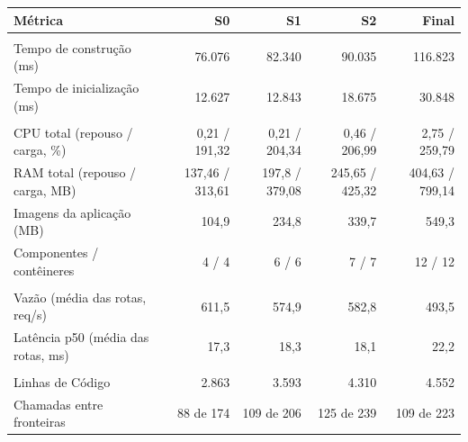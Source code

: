 \begin{quadro}[htb]
  \centering
  \caption{Leilões --- métricas por snapshot --- Capacidade de Negócio.}
  \label{qua:comp_auction_capacidade-negocio_snapshots}
  \renewcommand{\arraystretch}{1.15}
  \begin{tabularx}{\textwidth}{|>{\raggedright\arraybackslash}X|r|r|r|r|}
    \hline
    \textbf{Métrica} & \textbf{S0} & \textbf{S1} & \textbf{S2} & \textbf{Final} \\
    \hline
    \multicolumn{5}{|l|}{\textbf{Agilidade}} \\
    \hline
    Tempo de construção (ms) & 76.076 & 82.340 & 90.035 & 116.823 \\
    Tempo de inicialização (ms) & 12.627 & 12.843 & 18.675 & 30.848 \\
    \hline
    \multicolumn{5}{|l|}{\textbf{Custo}} \\
    \hline
    CPU total (repouso / carga, \%) & 0,21 / 191,32 & 0,21 / 204,34 & 0,46 / 206,99 & 2,75 / 259,79 \\
    RAM total (repouso / carga, MB) & 137,46 / 313,61 & 197,8 / 379,08 & 245,65 / 425,32 & 404,63 / 799,14 \\
    Imagens da aplicação (MB) & 104,9 & 234,8 & 339,7 & 549,3 \\
    Componentes / contêineres & 4 / 4 & 6 / 6 & 7 / 7 & 12 / 12 \\
    \hline
    \multicolumn{5}{|l|}{\textbf{Desempenho}} \\
    \hline
    Vazão (média das rotas, req/s) & 611,5 & 574,9 & 582,8 & 493,5 \\
    Latência p50 (média das rotas, ms) & 17,3 & 18,3 & 18,1 & 22,2 \\
    \hline
    \multicolumn{5}{|l|}{\textbf{Manutenibilidade}} \\
    \hline
    Linhas de Código & 2.863 & 3.593 & 4.310 & 4.552 \\
    Chamadas entre fronteiras & 88 de 174 & 109 de 206 & 125 de 239 & 109 de 223 \\
    \hline
  \end{tabularx}
\end{quadro}
